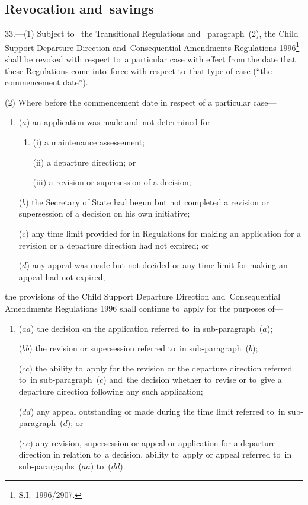 \documentclass[12pt,a4paper]{article}
\begin{document}
\renewcommand\parthead{--- Part IX}

\subsection[33. Revocation and~savings]{Revocation and~savings}

33.---(1)  Subject to~
the Transitional Regulations and~ %
paragraph~(2), the Child Support Departure Direction and~Consequential Amendments Regulations 1996\footnote{S.I.\ 1996/2907.} shall be revoked with respect to~a particular case with effect from the date that these Regulations come into~force with respect to~that type of case (“the commencement date”).

(2) Where before the commencement date in respect of a particular case—
\begin{enumerate}\item[]
($a$) an application was made and~not determined for—
\begin{enumerate}\item[]
(i) a maintenance assessement;

(ii) a departure direction; or

(iii) a revision or supersession of a decision;
\end{enumerate}

($b$) the Secretary of State had begun but not completed a revision or supersession of a decision on his own initiative;

($c$) any time limit provided for in Regulations for making an application for a revision or a departure direction had not expired; or

($d$) any appeal was made but not decided or any time limit for making an appeal had not expired,
\end{enumerate}
the provisions of the Child Support Departure Direction and~Consequential Amendments Regulations 1996 shall continue to~apply for the purposes of—
\begin{enumerate}\item[]
($aa$) the decision on the application referred to~in sub-paragraph~($a$);

($bb$) the revision or supersession referred to~in sub-paragraph~($b$);

($cc$) the ability to~apply for the revision or the departure direction referred to~in sub-paragraph~($c$)  and~the decision whether to~revise or to~give a departure direction following any such application;

($dd$) any appeal outstanding or made during the time limit referred to~in sub-paragraph~($d$); or

\pagebreak[3]

($ee$) any revision, supersession or appeal or application for a departure direction in relation to~a decision, ability to~apply or appeal referred to~in sub-parargaphs~($aa$)  to~($dd$).
\end{enumerate}
\end{document}
